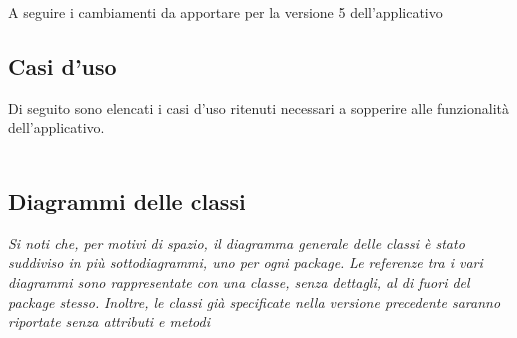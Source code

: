 A seguire i cambiamenti da apportare per la versione 5 dell'applicativo

\subsection{Casi d'uso}
Di seguito sono elencati i casi d'uso ritenuti necessari a sopperire alle funzionalità
dell'applicativo.
\\\\


\pagebreak


\pagebreak
\subsection{Diagrammi delle classi}

\textit{Si noti che, per motivi di spazio, il diagramma generale delle classi è stato suddiviso in più sottodiagrammi, uno per ogni package.}
\textit{Le referenze tra i vari diagrammi sono rappresentate con una classe, senza dettagli, al di fuori del package stesso.}
\textit{Inoltre, le classi già specificate nella versione precedente saranno riportate senza attributi e metodi}


